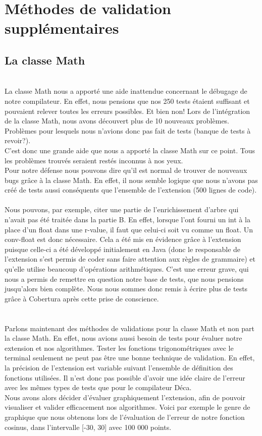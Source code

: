 \documentclass{article}
\begin{document}
\section{Méthodes de validation supplémentaires}
\subsection{La classe Math}

\\
La classe Math nous a apporté une aide inattendue concernant le débugage de notre compilateur. En effet, nous pensions que nos 250 tests étaient suffisant
et pouvaient relever toutes les erreurs possibles. Et bien non! Lors de l'intégration de la classe Math, nous avons découvert plus de 10 nouveaux problèmes. Problèmes
pour lesquels nous n'avions donc pas fait de tests (banque de tests à revoir?).\\
C'est donc une grande aide que nous a apporté la classe Math sur ce point. Tous les problèmes trouvés seraient restés inconnus à nos yeux. \\
Pour notre défense nous pouvons dire qu'il est normal de trouver de nouveaux bugs grâce à la classe Math. En effet, il nous semble logique que nous
n'avons pas créé de tests aussi conséquents que l'ensemble de l'extension (500 lignes de code).\\
\\
Nous pouvons, par exemple, citer une partie de l'enrichissement d'arbre qui n'avait pas été traitée dans la partie B. En effet, lorsque l'ont fourni un int à la place
d'un float dans une r-value, il faut que celui-ci soit vu comme un float. Un conv-float est donc nécessaire. Cela a été mis en évidence grâce à l'extension puisque
celle-ci a été développé initialement en Java (donc le responsable de l'extension s'est permis de coder sans faire attention aux règles de grammaire) et qu'elle
 utilise beaucoup d'opérations arithmétiques. C'est une erreur grave, qui nous a permis de remettre en question notre base de tests, que nous pensions jusqu'alors bien complète.
 Nous nous sommes donc remis à écrire plus de tests grâce à Cobertura après cette prise de conscience.
\\
\\ \\
Parlons maintenant des méthodes de validations pour la classe Math et non part la classe Math. En effet, nous avions aussi besoin de tests pour évaluer notre extension et nos
algorithmes. Tester les fonctions trigonométriques avec le terminal seulement ne peut pas être une bonne technique de validation. En effet, la précision de l'extension est variable
suivant l'ensemble de définition des fonctions utilisées. Il n'est donc pas possible d'avoir une idée claire de l'erreur avec les mêmes types de tests que pour le
compilateur Déca.
\\
Nous avons alors décider d'évaluer graphiquement l'extension, afin de pouvoir visualiser et valider efficacement nos algorithmes. Voici par exemple le genre de graphique
que nous obtenons lors de l'évaluation de l'erreur de notre fonction cosinus, dans l'intervalle [-30, 30] avec 100 000 points.\\
\end{document}
